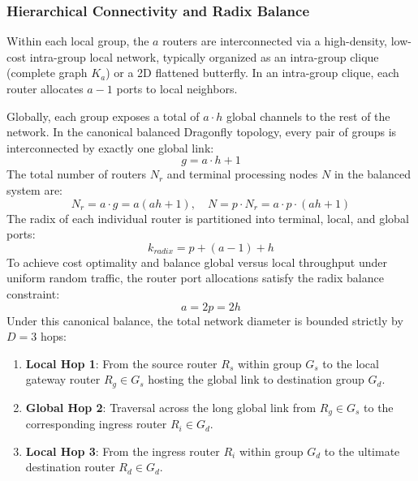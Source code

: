 \subsubsection{Hierarchical Connectivity and Radix Balance}
Within each local group, the $a$ routers are interconnected via a high-density, low-cost intra-group local network, typically organized as an intra-group clique (complete graph $K_a$) or a 2D flattened butterfly. In an intra-group clique, each router allocates $a - 1$ ports to local neighbors.

Globally, each group exposes a total of $a \cdot h$ global channels to the rest of the network. In the canonical balanced Dragonfly topology, every pair of groups is interconnected by exactly one global link:
\begin{equation}
g = a \cdot h + 1
\label{eq:ch4_dragonfly_groups}
\end{equation}
The total number of routers $N_r$ and terminal processing nodes $N$ in the balanced system are:
\begin{equation}
N_r = a \cdot g = a(ah + 1), \quad N = p \cdot N_r = a \cdot p \cdot (ah + 1)
\label{eq:ch4_dragonfly_nodes}
\end{equation}
The radix of each individual router is partitioned into terminal, local, and global ports:
\begin{equation}
k_{radix} = p + (a - 1) + h
\label{eq:ch4_dragonfly_radix}
\end{equation}
To achieve cost optimality and balance global versus local throughput under uniform random traffic, the router port allocations satisfy the radix balance constraint:
\begin{equation}
a = 2p = 2h
\label{eq:ch4_dragonfly_balance}
\end{equation}
Under this canonical balance, the total network diameter is bounded strictly by $D = 3$ hops:
\begin{enumerate}
    \item \textbf{Local Hop 1}: From the source router $R_s$ within group $G_s$ to the local gateway router $R_g \in G_s$ hosting the global link to destination group $G_d$.
    \item \textbf{Global Hop 2}: Traversal across the long global link from $R_g \in G_s$ to the corresponding ingress router $R_i \in G_d$.
    \item \textbf{Local Hop 3}: From the ingress router $R_i$ within group $G_d$ to the ultimate destination router $R_d \in G_d$.
\end{enumerate}

